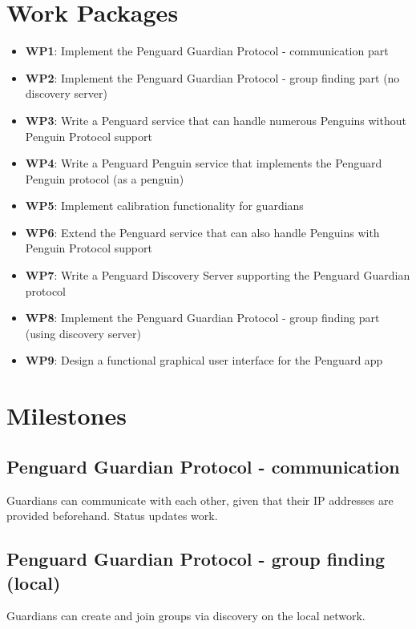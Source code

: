\documentclass{report}
\begin{document}
\section{Work Packages}

\begin{itemize}
        \item {\bf WP1}: Implement the Penguard Guardian Protocol - communication part
        \item {\bf WP2}: Implement the Penguard Guardian Protocol - group finding part (no discovery server)
        \item {\bf WP3}: Write a Penguard service that can handle numerous Penguins without Penguin Protocol support
        \item {\bf WP4}: Write a Penguard Penguin service that implements the Penguard Penguin protocol (as a penguin)
        \item {\bf WP5}: Implement calibration functionality for guardians
        \item {\bf WP6}: Extend the Penguard service that can also handle Penguins with Penguin Protocol support
        \item {\bf WP7}: Write a Penguard Discovery Server supporting the Penguard Guardian protocol
        \item {\bf WP8}: Implement the Penguard Guardian Protocol - group finding part (using discovery server)
        \item {\bf WP9}: Design a functional graphical user interface for the Penguard app
\end{itemize}
 

\section{Milestones}

\subsection{Penguard Guardian Protocol - communication}

Guardians can communicate with each other, given that their IP addresses are provided beforehand. Status updates work.

\subsection{Penguard Guardian Protocol - group finding (local)}

Guardians can create and join groups via discovery on the local network.
\end{document}
